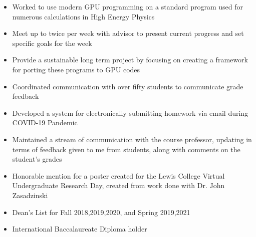 \documentclass[10pt,a4paper,ragged2e]{altacv}
\begin{document}
\divider

\begin{itemize}
\item Worked to use modern GPU programming on a standard program used for numerous calculations in High Energy Physics
\item Meet up to twice per week with advisor to present current progress and set specific goals for the week
\item Provide a sustainable long term project by focusing on creating a framework for porting these programs to GPU codes 
\end{itemize}

\divider

\begin{itemize}
\item Coordinated communication with over fifty students to communicate grade feedback
\item Developed a system for electronically submitting homework via email during COVID-19 Pandemic
\item Maintained a stream of communication with the course professor, updating in terms of feedback given to me from students, along with comments on the student's grades
\end{itemize}

\divider

\begin{itemize}
\item Honorable mention for a poster created for the Lewis College Virtual Undergraduate Research Day, created from work done with Dr. John Zasadzinski
\item Dean's List for Fall 2018,2019,2020, and Spring 2019,2021
\item International Baccalaureate Diploma holder
\end{itemize}
\end{document}
